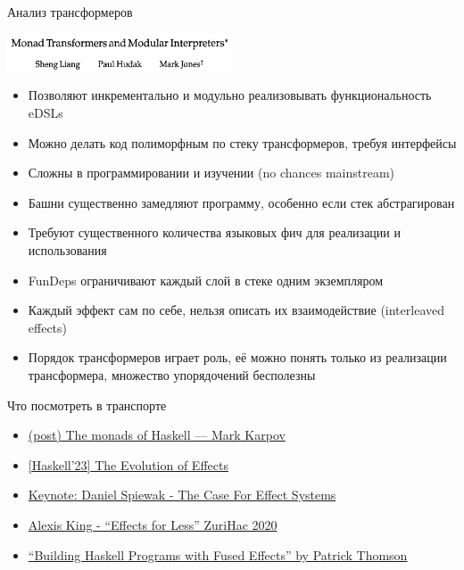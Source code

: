     \begin{frame}[fragile]{Анализ трансформеров}
        \begin{center}
            \includegraphics[width=0.5\textwidth]{figs/transformers}
        \end{center}
        \begin{itemize}
            \item[\positive] Позволяют инкрементально и модульно реализовывать функциональность eDSLs
            \item[\positive] Можно делать код полиморфным по стеку трансформеров, требуя интерфейсы
            \item[\negative] Сложны в программировании и изучении (no chances mainstream)
            \item[\negative] Башни существенно замедляют программу, особенно если стек абстрагирован
            \item[\negative] Требуют существенного количества языковых фич для реализации и использования
            \item[\negative] FunDeps ограничивают каждый слой в стеке одним экземпляром
            \item[\negative] Каждый эффект сам по себе, нельзя описать их взаимодействие (interleaved effects)
            \item[\negative] Порядок трансформеров играет роль, её можно понять только из реализации трансформера, множество упорядочений бесполезны
        \end{itemize}
    \end{frame}


    \begin{frame}[fragile]{Что посмотреть в транспорте}
        \begin{itemize}
            \item \href{https://markkarpov.com/post/the-monads}{\color{blue}(post) The monads of Haskell --- Mark Karpov}
            \item \href{https://youtu.be/m821Vz8N_bo?si=f-2cR0QExCWZr-BK}{\color{blue} [Haskell'23] The Evolution of Effects }
            \item \href{https://youtu.be/qgfCmQ-2tW0?si=6BjvijRPU2hEmk49}{\color{blue}  Keynote: Daniel Spiewak - The Case For Effect Systems }
            \item \href{https://www.youtube.com/live/0jI-AlWEwYI?si=KzgcHDgZ4GseytRA}{\color{blue} Alexis King - ``Effects for Less'' ZuriHac 2020}
            \item \href{https://youtu.be/vfDazZfxlNs?si=Sjfitsfe33jpbMth}{\color{blue}  ``Building Haskell Programs with Fused Effects'' by Patrick Thomson}
        \end{itemize}
    \end{frame}

